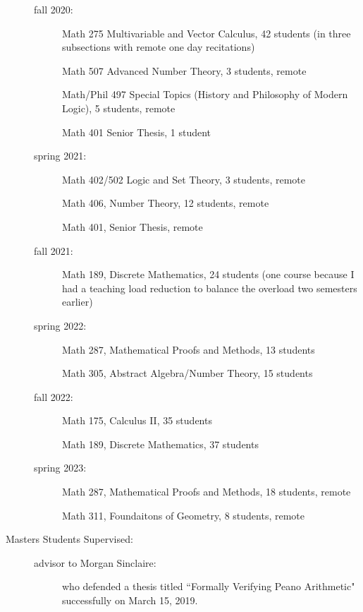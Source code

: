 \begin{description}
\begin{description}
\item[fall 2020:]  

Math 275 Multivariable and Vector Calculus, 42 students (in three subsections with remote one day recitations)

Math 507 Advanced Number Theory, 3 students, remote

Math/Phil 497 Special Topics (History and Philosophy of Modern Logic), 5 students, remote

Math 401 Senior Thesis, 1 student

\item[spring 2021:]

Math 402/502 Logic and Set Theory, 3 students, remote

Math 406, Number Theory, 12 students, remote

Math 401, Senior Thesis, remote

\item[fall 2021:]

Math 189, Discrete Mathematics, 24 students (one course because I had a teaching load reduction to balance the overload
two semesters earlier)

\item[spring 2022:]

Math 287, Mathematical Proofs and Methods, 13 students

Math 305, Abstract Algebra/Number Theory, 15 students

\item[fall 2022:]

Math 175, Calculus II, 35 students

Math 189, Discrete Mathematics, 37 students

\item[spring 2023:]

Math 287, Mathematical Proofs and Methods, 18 students, remote

Math 311, Foundaitons of Geometry, 8 students, remote

\end{description}



\item[Masters Students Supervised:]

\begin{description}

\item[]

\item[advisor to Morgan Sinclaire:]  who defended a thesis titled ``Formally Verifying Peano Arithmetic" successfully on March 15, 2019.


\end{description}
\end{description}
